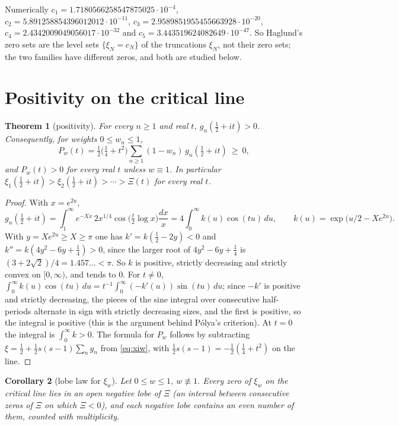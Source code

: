 \documentclass[11pt]{article}
\theoremstyle{plain}
\newtheorem{theorem}{Theorem}[section]
\newtheorem{corollary}[theorem]{Corollary}
\theoremstyle{definition}
\theoremstyle{remark}
\begin{document}
Numerically $c_1 = 1.7180566258547875025\cdot 10^{-4}$,
$c_2 = 5.891258854396012012\cdot 10^{-11}$,
$c_3 = 2.9589851955455663928\cdot 10^{-20}$,
$c_4 = 2.4342009049056017\cdot 10^{-32}$ and
$c_5 = 3.443519624082649\cdot 10^{-47}$. So Haglund's zero sets are the
level sets $\{\xi_N = c_N\}$ of the truncations $\xi_N$, not their zero sets; the
two families have different zeros, and both are studied below.

\section{Positivity on the critical line}
\label{sec:positivity}

\begin{theorem}[positivity]\label{thm:polya}
For every $n \ge 1$ and real $t$, $g_n(\tfrac12 + it) > 0$. Consequently, for
weights $0 \le w_n \le 1$,
\[
P_w(t) = \tfrac12\bigl(\tfrac14 + t^2\bigr)\sum_{n \ge 1}(1 - w_n)\,g_n(\tfrac12 + it)
\ \ge\ 0,
\]
and $P_w(t) > 0$ for every real $t$ unless
$w \equiv 1$. In particular
$\xi_1(\tfrac12+it) > \xi_2(\tfrac12+it) > \cdots > \Xi(t)$ for every real $t$.
\end{theorem}

\begin{proof}
With $x = e^{2u}$,
\[
g_n(\tfrac12+it) = \int_1^\infty e^{-Xx}\,2x^{1/4}\cos\bigl(\tfrac t2\log x\bigr)
\frac{dx}{x} = 4\int_0^\infty k(u)\cos(tu)\,du, \qquad
k(u) = \exp\bigl(u/2 - Xe^{2u}\bigr).
\]
With $y = Xe^{2u} \ge X \ge \pi$ one has $k' = k(\tfrac12 - 2y) < 0$ and
$k'' = k(4y^2 - 6y + \tfrac14) > 0$, since the larger root of
$4y^2 - 6y + \tfrac14$ is $(3 + 2\sqrt2)/4 = 1.457\ldots < \pi$. So $k$ is
positive, strictly decreasing and strictly convex on $[0,\infty)$, and tends to
$0$. For $t \ne 0$,
$\int_0^\infty k(u)\cos(tu)\,du = t^{-1}\int_0^\infty(-k'(u))\sin(tu)\,du$; since
$-k'$ is positive and strictly decreasing, the pieces of the sine integral over
consecutive half-periods alternate in sign with strictly decreasing sizes, and
the first is positive, so the integral is positive (this is the argument behind
P\'olya's criterion). At $t = 0$ the integral is $\int_0^\infty k > 0$. The
formula for $P_w$ follows by subtracting
$\xi = \tfrac12 + \tfrac12 s(s-1)\sum_n g_n$ from \eqref{eq:xiw}, with
$\tfrac12 s(s-1) = -\tfrac12(\tfrac14 + t^2)$ on the line.
\end{proof}

\begin{corollary}[lobe law for $\xi_w$]\label{cor:lobe}
Let $0 \le w \le 1$, $w \not\equiv 1$. Every zero of $\xi_w$ on the critical line
lies in an open negative lobe of $\Xi$ (an interval between consecutive zeros of
$\Xi$ on which $\Xi < 0$), and each negative lobe contains an even number of
them, counted with multiplicity.
\end{corollary}
\end{document}
